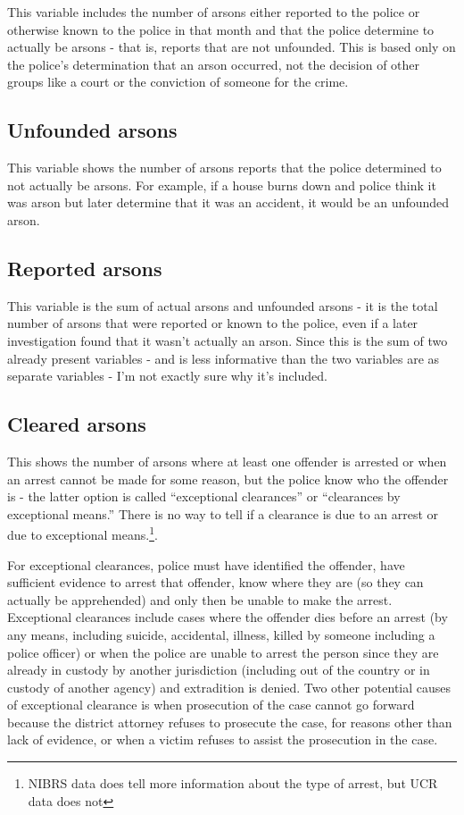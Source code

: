 \documentclass[
  12pt,
  openany]{book}
\begin{document}
This variable includes the number of arsons either reported to the police or otherwise known to the police in that month and that the police determine to actually be arsons - that is, reports that are not unfounded. This is based only on the police's determination that an arson occurred, not the decision of other groups like a court or the conviction of someone for the crime.

\hypertarget{unfounded-arsons}{%
\subsection{Unfounded arsons}\label{unfounded-arsons}}

This variable shows the number of arsons reports that the police determined to not actually be arsons. For example, if a house burns down and police think it was arson but later determine that it was an accident, it would be an unfounded arson.

\hypertarget{reported-arsons}{%
\subsection{Reported arsons}\label{reported-arsons}}

This variable is the sum of actual arsons and unfounded arsons - it is the total number of arsons that were reported or known to the police, even if a later investigation found that it wasn't actually an arson. Since this is the sum of two already present variables - and is less informative than the two variables are as separate variables - I'm not exactly sure why it's included.

\hypertarget{cleared-arsons}{%
\subsection{Cleared arsons}\label{cleared-arsons}}

This shows the number of arsons where at least one offender is arrested or when an arrest cannot be made for some reason, but the police know who the offender is - the latter option is called ``exceptional clearances'' or ``clearances by exceptional means.'' There is no way to tell if a clearance is due to an arrest or due to exceptional means.\footnote{NIBRS data does tell more information about the type of arrest, but UCR data does not}.

For exceptional clearances, police must have identified the offender, have sufficient evidence to arrest that offender, know where they are (so they can actually be apprehended) and only then be unable to make the arrest. Exceptional clearances include cases where the offender dies before an arrest (by any means, including suicide, accidental, illness, killed by someone including a police officer) or when the police are unable to arrest the person since they are already in custody by another jurisdiction (including out of the country or in custody of another agency) and extradition is denied. Two other potential causes of exceptional clearance is when prosecution of the case cannot go forward because the district attorney refuses to prosecute the case, for reasons other than lack of evidence, or when a victim refuses to assist the prosecution in the case.
\end{document}

